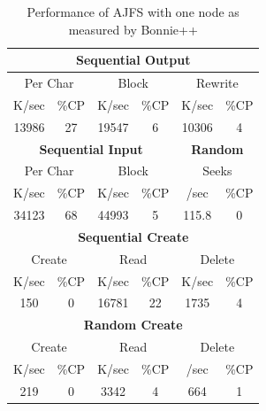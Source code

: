 \begin{table}[Ht]
\centering
\begin{tabular}{| c | c | c | c | c | c |}
\hline
\multicolumn{6}{|c|}{\bf Sequential Output}\\
\hline
\multicolumn{2}{|c|}{Per Char} &
\multicolumn{2}{c|}{Block} &
\multicolumn{2}{c|}{Rewrite} \\
\hline
K/sec & \%CP & K/sec & \%CP & K/sec & \%CP \\
\hline
 13986 & 27 & 19547 & 6 & 10306 & 4 \\
\hline

\multicolumn{4}{|c|}{\bf Sequential Input} & \multicolumn{2}{c|}{\bf Random}\\
\hline
\multicolumn{2}{|c|}{Per Char} &
\multicolumn{2}{c|}{Block} &
\multicolumn{2}{c|}{Seeks} \\
\hline
K/sec & \%CP & K/sec & \%CP & /sec & \%CP \\
\hline
 34123 & 68 & 44993 & 5 & 115.8 & 0 \\
\hline

\multicolumn{6}{|c|}{\bf Sequential Create}\\
\hline
\multicolumn{2}{|c|}{Create} &
\multicolumn{2}{c|}{Read} &
\multicolumn{2}{c|}{Delete} \\
\hline
K/sec & \%CP & K/sec & \%CP & K/sec & \%CP \\
\hline
150 & 0 & 16781 & 22 & 1735 & 4 \\
\hline

\multicolumn{6}{|c|}{\bf Random Create}\\
\hline
\multicolumn{2}{|c|}{Create} &
\multicolumn{2}{c|}{Read} &
\multicolumn{2}{c|}{Delete} \\
\hline
K/sec & \%CP & K/sec & \%CP & /sec & \%CP \\
\hline
219 & 0 & 3342 & 4 & 664 & 1 \\
\hline
\end{tabular}
\caption{Performance of AJFS with one node as measured by Bonnie++}
\label{tab:bonnie-1n}
\end{table}




